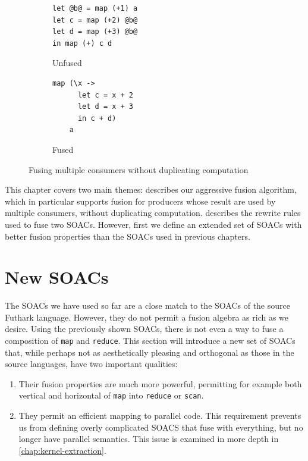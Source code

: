 \begin{figure}
\begin{subfigure}[t]{0.4\textwidth}
\begin{lstlisting}
let @b@ = map (+1) a
let c = map (+2) @b@
let d = map (+3) @b@
in map (+) c d
\end{lstlisting}
\caption{Unfused}
\end{subfigure}%
\hspace{.1\textwidth}
\begin{subfigure}[t]{0.4\textwidth}
\begin{lstlisting}
map (\x ->
      let c = x + 2
      let d = x + 3
      in c + d)
    a
\end{lstlisting}
\caption{Fused}
\end{subfigure}%
\caption{Fusing multiple consumers without duplicating computation}
\label{fig:fusion-multiple-consumers}
\end{figure}

This chapter covers two main themes: 
describes our aggressive fusion algorithm, which in particular
supports fusion for producers whose result are used by multiple
consumers, without duplicating computation.  
describes the rewrite rules used to fuse two SOACs.  However, first we
define an extended set of SOACs with better fusion properties than the
SOACs used in previous chapters.

\section{New SOACs}
\label{sec:fusion-in-futhark}

The SOACs we have used so far are a close match to the SOACs of the
source Futhark language.  However, they do not permit a fusion algebra
as rich as we desire.  Using the previously shown SOACs, there is not
even a way to fuse a composition of \lstinline{map} and
\lstinline{reduce}.  This section will introduce a new set of SOACs
that, while perhaps not as aesthetically pleasing and orthogonal as
those in the source languages, have two important qualities:

\begin{enumerate}
\item Their fusion properties are much more powerful, permitting for
  example both vertical and horizontal of \lstinline{map} into
  \lstinline{reduce} or \lstinline{scan}.
\item They permit an efficient mapping to parallel code.  This
  requirement prevents us from defining overly complicated SOACS that
  fuse with everything, but no longer have parallel semantics.  This
  issue is examined in more depth in \cref{chap:kernel-extraction}.
\end{enumerate}

